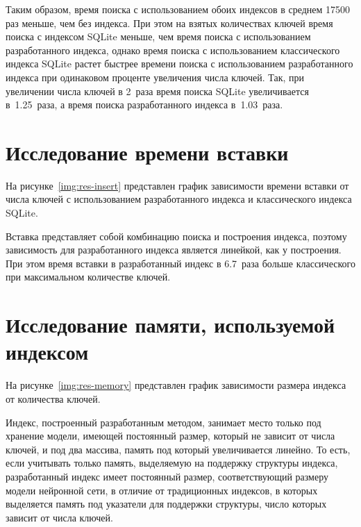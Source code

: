 Таким образом, время поиска с использованием обоих индексов в среднем 17500 раз
меньше, чем без индекса. При этом на взятых количествах ключей время поиска с
индексом SQLite меньше, чем время поиска с использованием разработанного
индекса, однако время поиска с использованием классического индекса SQLite
растет быстрее времени поиска с использованием разработанного индекса при
одинаковом проценте увеличения числа ключей. Так, при увеличении числа ключей в
2~раза время поиска SQLite увеличивается в~1.25~раза, а время поиска
разработанного индекса в~1.03~раза.

\section{Исследование времени вставки}

На рисунке~\ref{img:res-insert} представлен график зависимости времени вставки
от числа ключей с использованием разработанного индекса и классического индекса
SQLite.


Вставка представляет собой комбинацию поиска и построения индекса, поэтому
зависимость для разработанного индекса является линейкой, как у построения.  При
этом время вставки в разработанный индекс в 6.7~раза больше классического при
максимальном количестве ключей.

\section{Исследование памяти, используемой индексом}

%

На рисунке~\ref{img:res-memory} представлен график зависимости размера индекса
от количества ключей.


Индекс, построенный разработанным методом, занимает место только под хранение
модели, имеющей постоянный размер, который не зависит от числа ключей, и под два
массива, память под который увеличивается линейно. То есть, если учитывать
только память, выделяемую на поддержку структуры индекса, разработанный индекс
имеет постоянный размер, соответствующий размеру модели нейронной сети, в отличие
от традиционных индексов, в которых выделяется память под указатели для
поддержки структуры, число которых зависит от числа ключей. 


